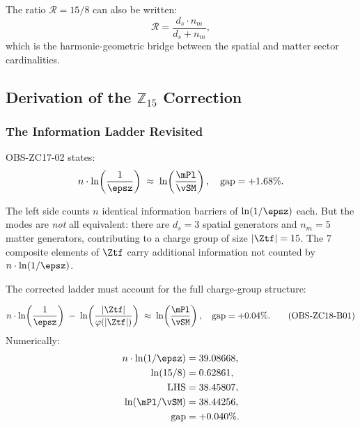 \documentclass[12pt, a4paper]{article}
\begin{document}
\noindent
The ratio $\mathcal{R} = 15/8$ can also be written:
\begin{equation}
  \mathcal{R} = \frac{d_s \cdot n_m}{d_s + n_m},
  \label{zc18b:eq:mrr-alt}
\end{equation}
which is the harmonic-geometric bridge between the spatial and matter
sector cardinalities.

\subsection{Derivation of the $\mathbb{Z}_{15}$ Correction}
\label{zc18b:sec:derivation}

\subsubsection{The Information Ladder Revisited}

OBS-ZC17-02 states:
\[
  n\cdot\ln\!\left(\frac{1}{\epsz}\right)
  \;\approx\; \ln\!\left(\frac{\mPl}{\vSM}\right),
  \quad \text{gap} = +1.68\%.
\]

The left side counts $n$ identical information barriers of $\ln(1/\epsz)$
each.
But the modes are \emph{not} all equivalent: there are $d_s=3$ spatial
generators and $n_m=5$ matter generators, contributing to a charge group
of size $|\Ztf|=15$.
The $7$ composite elements of $\Ztf$ carry additional information
not counted by $n\cdot\ln(1/\epsz)$.

The corrected ladder must account for the full charge-group structure:

\begin{keybox}[title={Corrected Information Ladder (OBS-ZC18-B01)}]
\begin{equation}
  n\cdot\ln\!\left(\frac{1}{\epsz}\right)
  \;-\; \ln\!\left(\frac{|\Ztf|}{\varphi(|\Ztf|)}\right)
  \;\approx\;
  \ln\!\left(\frac{\mPl}{\vSM}\right),
  \quad \text{gap} = +0.04\%.
  \tag{OBS-ZC18-B01}\label{zc18b:eq:corrected-ladder}
\end{equation}
Numerically:
\begin{align*}
  n\cdot\ln(1/\epsz) &= 39.08668, \\
  \ln(15/8)          &= 0.62861, \\
  \text{LHS}         &= 38.45807, \\
  \ln(\mPl/\vSM)     &= 38.44256,\\
  \text{gap}         &= +0.040\%.
\end{align*}
\end{keybox}
\end{document}

